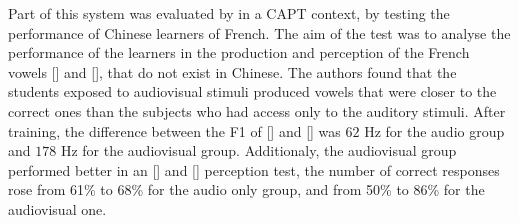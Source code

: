 Part of this system was evaluated by \citeauthor{Wang2014} \citep{Wang2014} in a \ac{CAPT} context, by testing the
performance of Chinese learners of French. The aim of the test was to analyse the performance of the learners in the production 
and perception of the French vowels [\textipa{\o}] and [\textipa{\oe}], that do not exist in Chinese. The authors found that the 
students exposed to audiovisual stimuli produced vowels that were closer to the correct ones than the subjects who had access only 
to the auditory stimuli. After training, the difference between the F1 of [\textipa{\o}] and [\textipa{\oe}] was $62$ Hz for the audio
group and $178$ Hz for the audiovisual group. Additionaly, the audiovisual group performed better in 
an [\textipa{\o}] and [\textipa{\oe}] perception test, the number of correct responses rose from 61\% to 68\% for the audio only
group, and from 50\% to 86\% for the audiovisual one.




